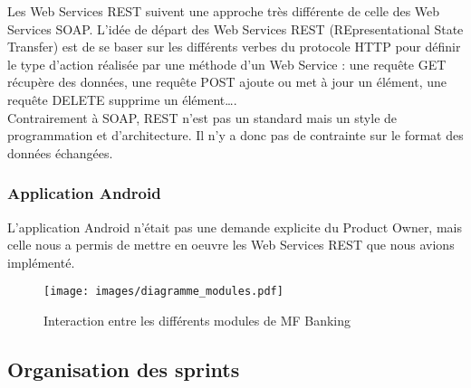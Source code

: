 Les Web Services REST suivent une approche très différente de celle des Web Services SOAP. L'idée de départ des Web Services REST (REpresentational State Transfer) est de se baser sur les différents \og verbes \fg{} du protocole HTTP pour définir le type d'action réalisée par une méthode d'un Web Service : une requête GET récupère des données, une requête POST ajoute ou met à jour un élément, une requête DELETE supprime un élément\ldots.\\
Contrairement à SOAP, REST n'est pas un standard mais un style de programmation et d'architecture. Il n'y a donc pas de contrainte sur le format des données échangées.\\

\subsubsection*{Application Android}

L'application Android n'était pas une demande explicite du Product Owner, mais celle nous a permis de mettre en oeuvre les Web Services REST que nous avions implémenté.

\begin{figure}[h!]
	\centering
		\texttt{[image: images/diagramme\_modules.pdf]}
	\caption{Interaction entre les différents modules de MF Banking}
\end{figure}  

\subsection{Organisation des sprints}

